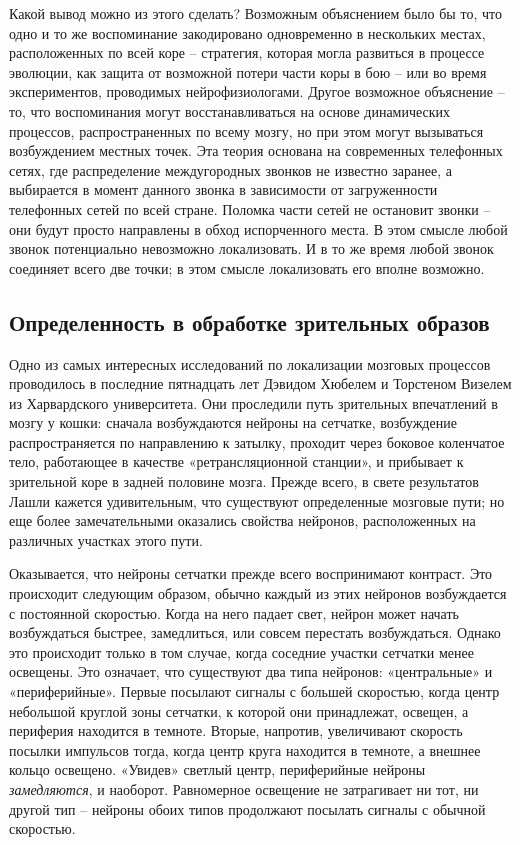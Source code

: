 \documentclass[../main.tex]{subfiles}
\begin{document}
Какой вывод можно из этого сделать? Возможным объяснением было бы то, что одно и то же воспоминание закодировано одновременно в нескольких местах, расположенных по всей коре \--- стратегия, которая могла развиться в процессе эволюции, как защита от возможной потери части коры в бою \--- или во время экспериментов, проводимых нейрофизиологами. Другое возможное объяснение \--- то, что воспоминания могут восстанавливаться на основе динамических процессов, распространенных по всему мозгу, но при этом могут вызываться возбуждением местных точек. Эта теория основана на современных телефонных сетях, где распределение междугородных звонков не известно заранее, а выбирается в момент данного звонка в зависимости от загруженности телефонных сетей по всей стране. Поломка части сетей не остановит звонки \--- они будут просто направлены в обход испорченного места. В этом смысле любой звонок потенциально невозможно локализовать. И в то же время любой звонок соединяет всего две точки; в этом смысле локализовать его вполне возможно.


\subsection{Определенность в обработке зрительных образов}

Одно из самых интересных исследований по локализации мозговых процессов проводилось в последние пятнадцать лет Дэвидом Хюбелем и Торстеном Визелем из Харвардского университета. Они проследили путь зрительных впечатлений в мозгу у кошки: сначала возбуждаются нейроны на сетчатке, возбуждение распространяется по направлению к затылку, проходит через боковое коленчатое тело, работающее в качестве «ретрансляционной станции», и прибывает к зрительной коре в задней половине мозга. Прежде всего, в свете результатов Лашли кажется удивительным, что существуют определенные мозговые пути; но еще более замечательными оказались свойства нейронов, расположенных на различных участках этого пути.

Оказывается, что нейроны сетчатки прежде всего воспринимают контраст. Это происходит следующим образом, обычно каждый из этих нейронов возбуждается с постоянной скоростью. Когда на него падает свет, нейрон может начать возбуждаться быстрее, замедлиться, или совсем перестать возбуждаться. Однако это происходит только в том случае, когда соседние участки сетчатки менее освещены. Это означает, что существуют два типа нейронов: «центральные» и «периферийные». Первые посылают сигналы с большей скоростью, когда центр небольшой круглой зоны сетчатки, к которой они принадлежат, освещен, а периферия находится в темноте. Вторые, напротив, увеличивают скорость посылки импульсов тогда, когда центр круга находится в темноте, а внешнее кольцо освещено. «Увидев» светлый центр, периферийные нейроны \emph{замедляются}, и наоборот. Равномерное освещение не затрагивает ни тот, ни другой тип \--- нейроны обоих типов продолжают посылать сигналы с обычной скоростью.
\end{document}
